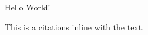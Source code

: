 \documentclass{article}
\begin{document}
    Hello World!

    This is a citations \cite{EPR-paper} inline with the text.

    

    \printbibliography
\end{document}
